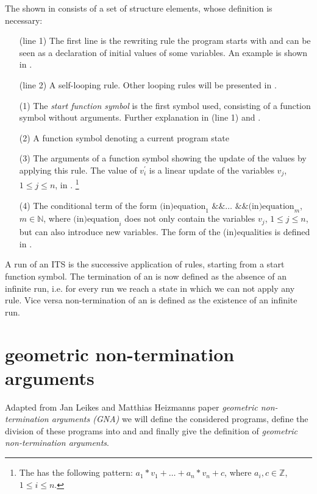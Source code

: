 The \its shown in  consists of a set of structure elements, whose definition is necessary:
\begin{enumerate}[leftmargin=1]
	\item[(line 1)] The first line is the rewriting rule the program starts with and can be seen as a declaration of initial values of some variables. An example is shown in .
	\item[(line 2)] A self-looping rule. Other looping rules will be presented in .
	\item[(1)] The \textit{start function symbol} is the first symbol used, consisting of a function symbol without arguments. Further explanation in (line 1) and .
	\item[(2)] A function symbol denoting a current program state
	\item[(3)] The arguments of a function symbol showing the update of the values by applying this rule. The value of $v^\prime_i$ is a linear update of the variables $v_j$, $1 \le j \le n$, in \stdLinInt. \footnote{The \stdLinInt has the following pattern: $ a_1*v_1 + \dots + a_n*v_n + c$, where $a_i , c \in \mathbb{Z}$, $1 \le i\le n$. }
	\item[(4)] The conditional term of the form $\text{(in)equation}_1 \text{ \&\& } \dots \text{ \&\& } \text{(in)equation}_m$, $m \in \mathbb{N}$, where $\text{(in)equation}_i$ does not only contain the variables $v_j$, $1 \le j \le n$, but can also introduce new variables. The form of the (in)equalities is defined in .	
\end{enumerate} 

A run of an ITS is the successive application of rules, starting from a start function symbol.
The termination of an \its is now defined as the absence of an infinite run, i.e. for every run we reach a state in which we can not apply any rule. Vice versa non-termination of an \its is defined as the existence of an infinite run.


\section{geometric non-termination arguments}
Adapted from Jan Leikes and Matthias Heizmanns paper \textit{geometric non-termination arguments (GNA)} \cite{leike2014geometric} we will define the considered programs, define the division of these programs into \stem and \loopt and finally give the definition of \textit{geometric non-termination arguments}.

